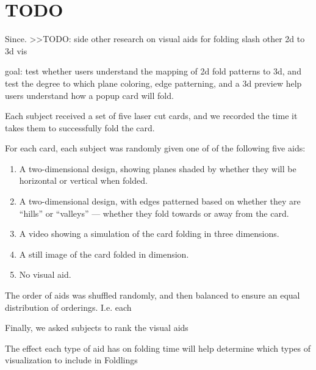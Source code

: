 \section{TODO}\label{todo}

Since. \textgreater{}\textgreater{}TODO: side other research on visual
aids for folding slash other 2d to 3d vis

goal: test whether users understand the mapping of 2d fold patterns to
3d, and test the degree to which plane coloring, edge patterning, and a
3d preview help users understand how a popup card will fold.

Each subject received a set of five laser cut cards, and we recorded the
time it takes them to successfully fold the card.

For each card, each subject was randomly given one of of the following
five aids:

\begin{enumerate}
\def\labelenumi{\arabic{enumi})}
\itemsep1pt\parskip0pt
\item
  A two-dimensional design, showing planes shaded by whether they will
  be horizontal or vertical when folded.
\item
  A two-dimensional design, with edges patterned based on whether they
  are ``hills'' or ``valleys'' --- whether they fold towards or away
  from the card.
\item
  A video showing a simulation of the card folding in three dimensions.
\item
  A still image of the card folded in dimension.
\item
  No visual aid.
\end{enumerate}

The order of aids was shuffled randomly, and then balanced to ensure an
equal distribution of orderings. I.e. each

Finally, we asked subjects to rank the visual aids

The effect each type of aid has on folding time will help determine
which types of visualization to include in Foldlings
